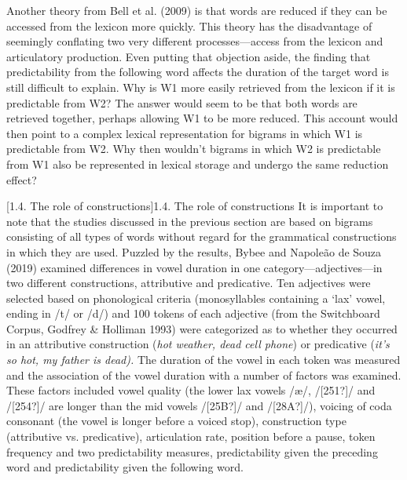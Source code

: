 \documentclass[12pt]{article}
\makeatletter
\renewcommand\subsection{\@startsection{subsection}{2}{0.0cm}{0.222in}{0.0835in}{\normalfont\normalsize\fontsize{16pt}{19.2pt}\selectfont\rmfamily\bfseries\raggedright}}
\newenvironment{styleStandard}{\setlength\leftskip{0cm}\setlength\rightskip{0cm plus 1fil}\setlength\parindent{0cm}\setlength\parfillskip{0pt plus 1fil}\setlength\parskip{0in plus 1pt}\writerlistparindent\writerlistleftskip\leavevmode\normalfont\normalsize\writerlistlabel\ignorespaces}{\unskip\vspace{0.111in plus 0.0111in}\par}
\newcommand\writerlistleftskip{}
\newcommand\writerlistparindent{}
\newcommand\writerlistlabel{}
\makeatother
\begin{document}
\begin{styleStandard}
Another theory from Bell et al. (2009) is that words are reduced if they can be accessed from the lexicon more quickly. This theory has the disadvantage of seemingly conflating two very different processes—access from the lexicon and articulatory production. Even putting that objection aside, the finding that predictability from the following word affects the duration of the target word is still difficult to explain. Why is W1 more easily retrieved from the lexicon if it is predictable from W2? The answer would seem to be that both words are retrieved together, perhaps allowing W1 to be more reduced. This account would then point to a complex lexical representation for bigrams in which W1 is predictable from W2. Why then wouldn’t bigrams in which W2 is predictable from W1 also be represented in lexical storage and undergo the same reduction effect? 
\end{styleStandard}

\subsection[1.4. The role of constructions]{1.4. The role of constructions}
\begin{styleStandard}
It is important to note that the studies discussed in the previous section are based on bigrams consisting of all types of words without regard for the grammatical constructions in which they are used. Puzzled by the results, Bybee and Napoleão de Souza (2019) examined differences in vowel duration in one category—adjectives—in two different constructions, attributive and predicative. Ten adjectives were selected based on phonological criteria (monosyllables containing a ‘lax’ vowel, ending in /t/ or /d/) and 100 tokens of each adjective (from the Switchboard Corpus, Godfrey \& Holliman 1993) were categorized as to whether they occurred in an attributive construction (\textit{hot weather, dead cell phone}) or predicative (\textit{it’s so hot, my father is dead). }The duration of the vowel in each token was measured and the association of the vowel duration with a number of factors was examined. These factors included vowel quality (the lower lax vowels /æ/, /[251?]/ and /[254?]/ are longer than the mid vowels /[25B?]/ and /[28A?]/), voicing of coda consonant (the vowel is longer before a voiced stop), construction type (attributive vs. predicative), articulation rate, position before a pause, token frequency and two predictability measures, predictability given the preceding word and predictability given the following word. 
\end{styleStandard}
\end{document}
